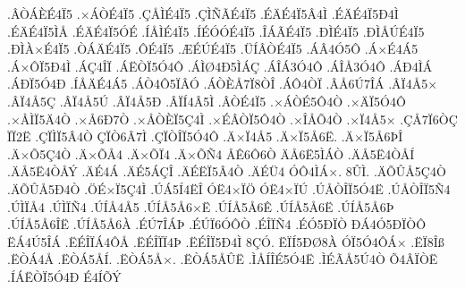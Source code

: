 {.^^c2^^d2^^c1^^c8^^c94^^cf5
.^^d7^^c1^^d2^^c94^^cf5
.^^c7^^c5^^cc^^c94^^cf5
.^^c7^^cc^^d1^^c3^^c94^^cf5
.^^c9^^c4^^c94^^cf5^^c24^^cc
.^^c9^^c4^^c94^^cf5^^d04^^cc
.^^c9^^c4^^c94^^cf5^^cc^^c5
.^^c9^^c4^^c94^^cf5^^d3^^c9
.^^cd^^c5^^cc^^c94^^cf5
.^^cd^^c9^^d3^^d3^^c94^^cf5
.^^ce^^c1^^c3^^c94^^cf5
.^^d0^^cc^^c94^^cf5
.^^d0^^cc^^c5^^da^^c94^^cf5
.^^d0^^cc^^c0^^d7^^c94^^cf5
.^^d2^^c1^^c4^^c94^^cf5
.^^d4^^c94^^cf5
.^^c6^^c9^^da^^c94^^cf5
.^^dc^^cd^^c2^^d2^^c94^^cf5
.^^c1^^c24^^d35^^d4
.^^c1^^d7^^c94^^c15
.^^c1^^d7^^d4^^cf5^^d04^^cc
.^^c1^^c74^^ce^^cf
.^^c1^^cb^^d2^^cf5^^d34^^d4
.^^c1^^cc^^d84^^d05^^cc^^c1^^c7
.^^c1^^ce^^c13^^d34^^d4
.^^c1^^ce^^c53^^d34^^d4
.^^c1^^d04^^cc^^c1
.^^c1^^d0^^cf5^^d34^^d0
.^^cd^^c5^^c4^^c94^^c15
.^^c1^^d24^^d45^^cf^^c2^^d3
.^^c1^^d2^^c8^^c57^^cf8^^d2^^ce
.^^c1^^d44^^d2^^cf
.^^c2^^c56^^da7^^ce^^c1
.^^c2^^cf4^^c55^^d7
.^^c2^^cf4^^c55^^c7
.^^c2^^cf4^^c55^^da
.^^c2^^cf4^^c55^^d0
.^^c2^^cf^^cd4^^c25^^cc
.^^c2^^d2^^c94^^cf5
.^^d7^^c1^^d2^^c95^^d44^^d2
.^^d7^^c4^^cf5^^d34^^d4
.^^d7^^c5^^cc^^cf5^^c44^^d2
.^^d7^^c56^^d07^^d2
.^^d7^^c5^^d2^^c8^^cf5^^c74^^cc
.^^d7^^c9^^c2^^d2^^cf5^^d44^^d2
.^^d7^^ce^^c5^^d54^^d2
.^^d7^^cf4^^c55^^d7
.^^c7^^c57^^cf6^^d2^^c7
^^cf^^cf2^^cb
.^^c7^^cf^^cc^^cf5^^c24^^d2
^^c7^^cf^^d26^^c27^^cc
.^^c7^^cf^^d2^^ce^^cf5^^d34^^d4
.^^c4^^d7^^cf4^^c55
.^^c4^^d7^^cf5^^c56^^cb.
.^^c4^^d7^^cf5^^c56^^de^^ce
.^^c4^^d7^^d55^^c74^^d2
.^^c4^^d7^^d5^^c54
.^^c4^^d7^^d5^^cf4
.^^c4^^d7^^d5^^d14
^^c5^^ca6^^d46^^d2
^^c4^^c56^^cb5^^cc^^c1^^d2
.^^c4^^c55^^cb4^^d2^^c5^^cd
.^^c4^^c55^^cb4^^d2^^c5^^dd
.^^c4^^c94^^c1
.^^c4^^c95^^c1^^c7^^ce
.^^c4^^c9^^cb^^cf5^^c24^^d2
.^^c4^^c9^^dc4
^^d3^^d44^^cc^^c1^^d7.
8^^db^^cc.
.^^c4^^d5^^db^^c55^^c74^^d2
.^^c4^^d5^^db^^c55^^d04^^d2
.^^d6^^c9^^d7^^cf5^^c74^^cc
.^^da^^c15^^cd4^^cb^^ce
^^d3^^cb4^^d7^^cf^^d6
^^d3^^cb4^^d7^^cf^^da
.^^da^^c5^^d2^^ce^^cf5^^d34^^cb
.^^da^^c5^^d2^^ce^^cf5^^d14
.^^da^^cc^^cf^^c54
.^^da^^cc^^cf^^d14
.^^da^^cd^^c54^^c55
.^^da^^cd^^c55^^c56^^d7^^cb
.^^da^^cd^^c55^^c56^^ca
.^^da^^cd^^c55^^c56^^cb
.^^da^^cd^^c55^^c56^^de
.^^da^^cd^^c55^^c56^^ce^^cb
.^^da^^cd^^c55^^c56^^c0
.^^c9^^da7^^ce^^c1^^de
.^^c9^^da^^cf6^^d3^^d4^^d2
.^^c9^^ce^^cf^^d14
.^^c9^^d35^^d0^^cf^^d2
^^d0^^c14^^d35^^d0^^cf^^d2^^d4
^^cb^^c14^^da5^^ce^^c1
.^^cb^^c9^^ce^^cf^^c14^^d4^^c5
.^^cb^^c9^^ce^^cf^^cf4^^de
.^^cb^^c9^^ce^^cf5^^d04^^cc
8^^c7^^d3.
^^cb^^cf^^cd5^^d0^^d88^^c0
^^d3^^cf5^^d34^^d4^^c1^^d7
.^^cb^^cf8^^ce^^df
.^^cb^^d2^^c14^^c5
.^^cb^^d2^^c15^^c5^^cd.
.^^cb^^d2^^c15^^c5^^d7.
.^^cb^^d2^^c15^^c5^^db^^cb
.^^cc^^c5^^cd^^ce^^c95^^d34^^cb
.^^cc^^c9^^c3^^c55^^da4^^d2
^^d54^^c2^^cf^^d2^^cb
.^^cd^^c1^^cb^^d2^^cf5^^d34^^d0
^^c94^^cd^^d5^^dd
}
